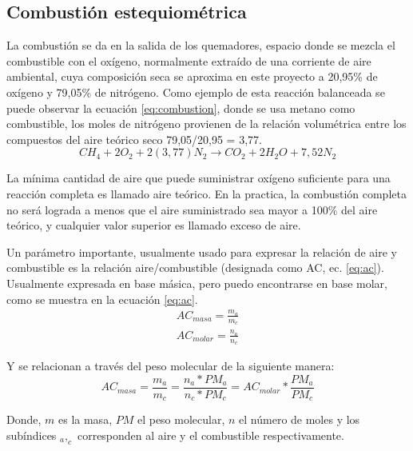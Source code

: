\subsection{Combustión estequiométrica}
\par La combustión se da en la salida de los quemadores, espacio donde se mezcla el combustible con el oxígeno, normalmente extraído de una corriente de aire ambiental, cuya composición seca se aproxima en este proyecto a 20,95\% de oxígeno y 79,05\% de nitrógeno. Como ejemplo de esta reacción balanceada se puede observar la ecuación \ref{eq:combustion}, donde se usa metano como combustible, los moles de nitrógeno provienen de la relación volumétrica entre los compuestos del aire teórico seco 79,05/20,95 = 3,77.
\begin{equation}
    \label{eq:combustion}
    CH_4 + 2O_2 + 2(3,77)N_2 \rightarrow CO_2 + 2H_2O + 7,52N_2
\end{equation}
\par La mínima cantidad de aire que puede suministrar oxígeno suficiente para una reacción completa es llamado aire teórico. En la practica, la combustión completa no será lograda a menos que el aire suministrado sea mayor a 100\% del aire teórico, y cualquier valor superior es llamado exceso de aire.
\par Un parámetro importante, usualmente usado para expresar la relación de aire y combustible es la relación aire/combustible (designada como AC, ec. \ref{eq:ac}). Usualmente expresada en base másica, pero puedo encontrarse en base molar, como se muestra en la ecuación \ref{eq:ac}.
\begin{gather}
\label{eq:ac}
    AC_{masa} = \frac{m_{a}}{m_{c}}\\
    AC_{molar} = \frac{n_{a}}{n_{c}}
\end{gather}
\par Y se relacionan a través del peso molecular de la siguiente manera:
\begin{equation}
\label{eq:ac_rel}
    AC_{masa} = \frac{m_{a}}{m_{c}} =
    \frac{n_{a}*PM_{a}}{n_{c}*PM_{c}} = AC_{molar}*\frac{PM_{a}}{PM_{c}}
\end{equation}
\par Donde, $m$ es la masa, $PM$ el peso molecular, $n$ el número de moles y los subíndices $_a,_c$ corresponden al aire y el combustible respectivamente.

